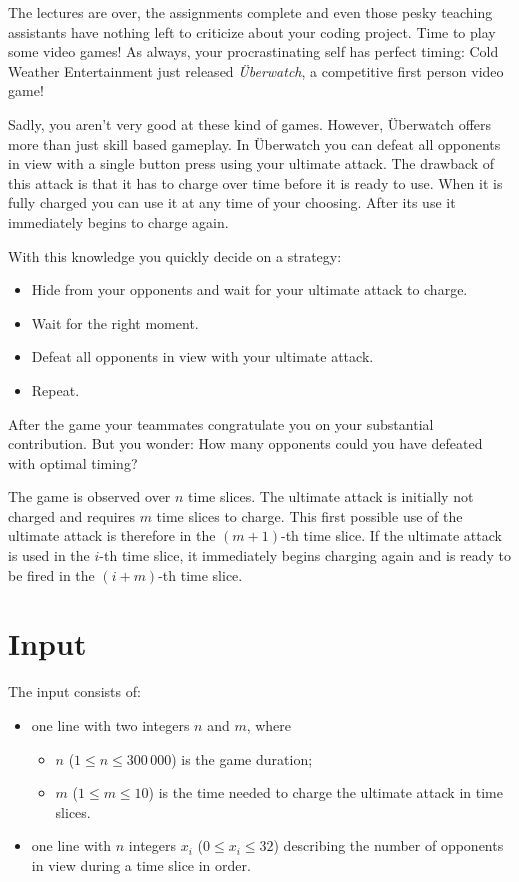 

The lectures are over, the assignments complete and even those pesky teaching assistants have nothing left to criticize about
your coding project. Time to play some video games!
As always, your procrastinating self has perfect timing: Cold Weather Entertainment just released \emph{Überwatch}, a competitive
first person video game! 

Sadly, you aren't very good at these kind of games. However, Überwatch offers more than just skill based gameplay.
In Überwatch you can defeat all opponents in view with a single button press using your ultimate attack.
The drawback of this attack is that it has to charge over time before it is ready to use. When it is fully charged you can use
it at any time of your choosing. After its use it immediately begins to charge again.

With this knowledge you quickly decide on a strategy: 
\begin{itemize}
\item Hide from your opponents and wait for your ultimate attack to charge.
\item Wait for the right moment.
\item Defeat all opponents in view with your ultimate attack. 
\item Repeat.
\end{itemize}
 
After the game your teammates congratulate you on your substantial contribution. But you wonder: How many opponents could you have
defeated with optimal timing?

The game is observed over $n$ time slices. The ultimate attack is initially not charged and requires $m$ time slices to charge.
This first possible use of the ultimate attack is therefore in the $(m+1)$-th time slice. If the ultimate attack is used in the $i$-th time slice,
it immediately begins charging again and is ready to be fired in the $(i+m)$-th time slice.


\section*{Input}
The input consists of:
\begin{itemize}
	\item one line with two integers $n$ and $m$, where
		\begin{itemize}
			\item $n$ ($1 \leq n \leq 300\,000$) is the game duration;
			\item $m$ ($1 \leq m \leq 10$) is the time needed to charge the ultimate attack in time slices.
		\end{itemize}
	\item one line with $n$ integers $x_i$ ($0 \leq x_i \leq 32$) describing the number of opponents in view during a time slice in order.
\end{itemize}



